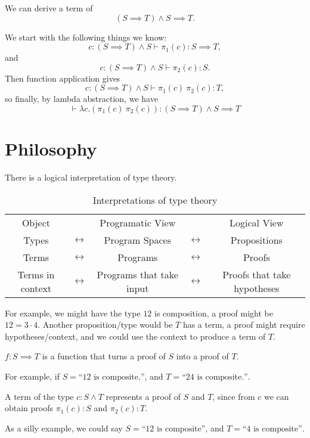\documentclass{article}
\newcommand{\yields}{\vdash}
\theoremstyle{remark}
\begin{document}
\begin{example}
    We can derive a term of 
    \[ (S\implies T) \wedge S \implies T. \]

    We start with the following things we know:
    \[ c:(S\implies T) \wedge S \yields \pi_1(c) : S\implies T, \]
    and
    \[ c:(S\implies T) \wedge S \yields \pi_2(c) : S. \]
    Then function application gives
    \[c:(S\implies T) \wedge S \yields \pi_1(c)\ \pi_2(c) : T,\]
    so finally, by lambda abstraction, we have 
    \[ \yields \lambda c.(\pi_1(c)\ \pi_2(c))
    : (S\implies T)\wedge S \implies T \]
\end{example}

\section{Philosophy}

There is a logical interpretation of type theory.
\begin{table}
\centering
\begin{tabular}{ccccc}
    Object & & Programatic View & & Logical View
    \\
    Types
    & $\longleftrightarrow$
    &
    Program Spaces
    & $\longleftrightarrow$
    &
    Propositions
    \\
    Terms
    & $\longleftrightarrow$
    &
    Programs
    & $\longleftrightarrow$
    &
    Proofs
    \\
    Terms in context
    & $\longleftrightarrow$
    &
    Programs that take input
    & $\longleftrightarrow$
    &
    Proofs that take hypotheses
    \\
\end{tabular}
\caption{Interpretations of type theory}
\end{table}

For example, we might have the type 
$12$ is composition, a proof might be $12 = 3\cdot 4$.
Another proposition/type would be $T$ has a term, a proof might 
require hypotheses/context, and we could use the context to 
produce a term of $T$.

\begin{example}
    $f:S\implies T$ is a function that turns a proof of $S$ into
    a proof of $T$.

    For example, if $S=\text{``$12$ is composite.''}$,
    and $T=\text{``$24$ is composite.''}$.
\end{example}

\begin{example}
    A term of the type $c:S\wedge T$ represents a proof of 
    $S$ and $T$, since from $c$ we can obtain proofs
    $\pi_1(c):S$ and $\pi_2(c):T$. 

    As a silly example, we could say $S=\text{``12 is composite''}$,
    and $T=\text{``4 is composite''}$.
\end{example}
\end{document}
